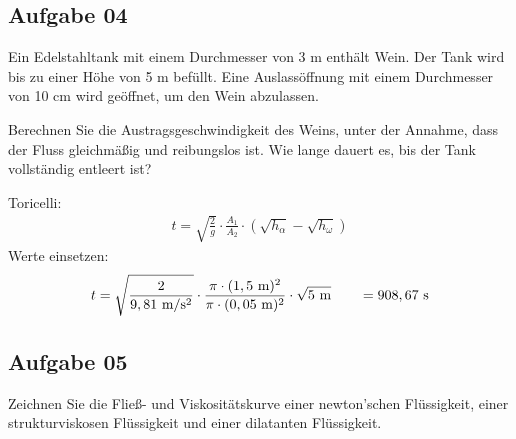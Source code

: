\documentclass[a4paper,11pt]{article}
\begin{document}
\subsection*{Aufgabe 04}
Ein Edelstahltank mit einem Durchmesser von 3 m enthält Wein. Der Tank wird bis zu
einer Höhe von 5 m befüllt. Eine Auslassöffnung mit einem Durchmesser von 10 cm wird
geöffnet, um den Wein abzulassen. \par Berechnen Sie die Austragsgeschwindigkeit des
Weins, unter der Annahme, dass der Fluss gleichmäßig und reibungslos ist. Wie lange
dauert es, bis der Tank vollständig entleert ist?


Toricelli:
\begin{align*}
t = \sqrt{\frac{2}{g}} \cdot \frac{A_1}{A_2} \cdot (\sqrt{h_{\alpha}}-\sqrt{h_{\omega}})
\end{align*}
Werte einsetzen:
\begin{align*}
t = \sqrt{\frac{2}{9,81~\text{m}/\text{s}^2}} \cdot \frac{\pi \cdot (1,5~\text{m})^2}{\pi \cdot (0,05~\text{m})^2} \cdot \sqrt{5~\text{m}} \qquad = 908,67~\text{s}
\end{align*}



\pagebreak
\subsection*{Aufgabe 05}
Zeichnen Sie die Fließ- und Viskositätskurve einer newton'schen Flüssigkeit, einer
strukturviskosen Flüssigkeit und einer dilatanten Flüssigkeit.
\ppbig
\end{document}
